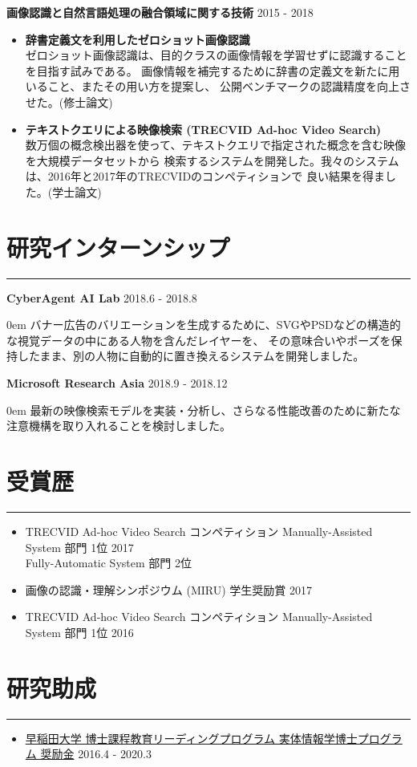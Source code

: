 \documentclass[a4paper,11pt]{ltjsarticle}
\newcommand{\sectrule}{
    \vspace*{-1.1\baselineskip}
    \noindent\rule{\linewidth}{3pt}}
\newcommand{\sepspace}{\vspace*{1em}}        %
\newcommand{\NewPart}[1]{\section*{\uppercase{#1}}\sectrule}
\newcommand{\EducationEntry}[3]{
        \noindent \textbf{#1} \hfill      %
      #2 \par  %
        \begin{addmargin}[2em]{0em}
            #3
        \end{addmargin}}
\begin{document}
\sepspace

\noindent \textbf{\large 画像認識と自然言語処理の融合領域に関する技術} \hfill 2015 - 2018
\begin{itemize}[leftmargin=2em,topsep=0.5em,itemsep=0em]
    \item \textbf{辞書定義文を利用したゼロショット画像認識} \\
    ゼロショット画像認識は、目的クラスの画像情報を学習せずに認識することを目指す試みである。
    画像情報を補完するために辞書の定義文を新たに用いること、またその用い方を提案し、
    公開ベンチマークの認識精度を向上させた。(修士論文)
    \item \textbf{テキストクエリによる映像検索 (TRECVID Ad-hoc Video Search)} \\
    数万個の概念検出器を使って、テキストクエリで指定された概念を含む映像を大規模データセットから
    検索するシステムを開発した。我々のシステムは、2016年と2017年のTRECVIDのコンペティションで
    良い結果を得ました。(学士論文)
\end{itemize}

\clearpage

\NewPart{研究インターンシップ}{}

\EducationEntry{CyberAgent AI Lab}{2018.6 - 2018.8}
{バナー広告のバリエーションを生成するために、SVGやPSDなどの構造的な視覚データの中にある人物を含んだレイヤーを、
その意味合いやポーズを保持したまま、別の人物に自動的に置き換えるシステムを開発しました。}

\sepspace

\EducationEntry{Microsoft Research Asia}{2018.9 - 2018.12}
{最新の映像検索モデルを実装・分析し、さらなる性能改善のために新たな注意機構を取り入れることを検討しました。}

\NewPart{受賞歴}{}
\begin{itemize}[leftmargin=2em,topsep=0.5em,itemsep=0em]
    \item TRECVID Ad-hoc Video Search コンペティション Manually-Assisted System 部門 1位 \hfill 2017 \\
    Fully-Automatic System 部門 2位
    \item 画像の認識・理解シンポジウム (MIRU) 学生奨励賞 \hfill 2017
    \item TRECVID Ad-hoc Video Search コンペティション Manually-Assisted System 部門 1位 \hfill 2016
\end{itemize}

\NewPart{研究助成}{}
\begin{itemize}[leftmargin=2em,topsep=0.5em,itemsep=0em]
    \item \href{http://www.leading-sn.waseda.ac.jp/student/scholarships/}{早稲田大学 博士課程教育リーディングプログラム 実体情報学博士プログラム 奨励金} \hfill 2016.4 - 2020.3
\end{itemize}
\end{document}
